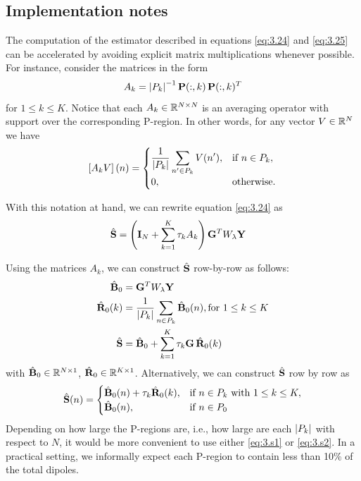\subsection{Implementation notes}

The computation of the estimator described in equations \eqref{eq:3.24} and \eqref{eq:3.25} can be accelerated by avoiding explicit matrix multiplications whenever possible.
%
For instance, consider the matrices in the form 
\begin{equation}
    A_k = \left| {P_k} \right|^{-1} \mathbf{P}(:,k)\, \mathbf{P}(:,k)^T
\end{equation}
for $1\leq k \leq K$. 
%
Notice that each $A_k \in \mathbb{R}^{N\times N}$ is an averaging operator with support over the corresponding P-region.
%
In other words, for any vector $V\in \mathbb{R}^{N}$ we have
\begin{equation}
    \left[ A_k V \right](n) =
    \begin{cases}
        {\displaystyle \frac{1}{ \left| {P_k} \right| } \sum_{n'\in P_k} V(n')}, 
        &\text{if } n\in P_k, \\
        0, &\text{otherwise}.
    \end{cases}
    \label{eq:4.30}
\end{equation}

With this notation at hand, we can rewrite equation \eqref{eq:3.24} as
\begin{align}
    \hat{\mathbf{S}}
    &=
    \left( \mathbf{I}_N + \sum_{k=1}^K \tau_k A_k \right)\mathbf{G}^T W_\lambda \mathbf{Y}
\end{align}


Using the matrices $A_k$, we can construct $\hat{\mathbf{S}}$ row-by-row as follows:
\begin{align}
    \hat{\mathbf{B}}_0
    &=
    \mathbf{G}^T W_\lambda \mathbf{Y} \\
    \hat{\mathbf{R}}_0(k)
    &=
    {\displaystyle \frac{1}{\left| {P_k} \right|} \sum_{n\in P_k} \hat{\mathbf{B}}_0(n)},
    \text{for } 1\leq k \leq K
    \\
    \hat{\mathbf{S}}
    &=
    \hat{\mathbf{B}}_0 + 
    \sum_{k=1}^K
    \tau_k \mathbf{G}\, \hat{\mathbf{R}}_0(k)
    \label{eq:3.s1}
\end{align}
with $\hat{\mathbf{B}}_0 \in \mathbb{R}^{N\times 1}$, $\hat{\mathbf{R}}_0 \in \mathbb{R}^{K\times 1}$.
%
Alternatively, we can construct $\hat{\mathbf{S}}$ row by row as
\begin{equation}
    \hat{\mathbf{S}}(n) =
    \begin{cases}
        \hat{\mathbf{B}}_0(n) + \tau_k \hat{\mathbf{R}}_0(k),
        &\text{if } n\in P_k \text{ with } 1\leq k \leq K,
        \\
        \hat{\mathbf{B}}_0(n), &\text{if } n\in P_0
    \end{cases}
    \label{eq:3.s2}
\end{equation}
Depending on how large the P-regions are, i.e., how large are each $\left| {P_k} \right|$ with respect to $N$, it would be more convenient to use
either \eqref{eq:3.s1} or \eqref{eq:3.s2}.
%
In a practical setting, we informally expect each P-region to contain less than 10\% of the total dipoles.

